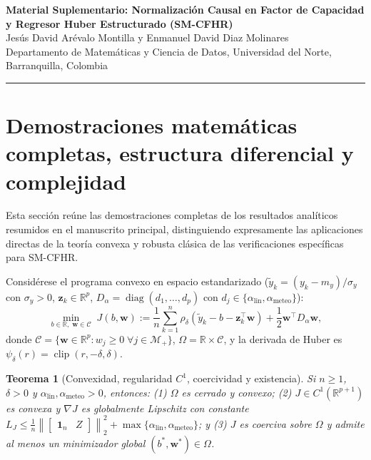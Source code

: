 \documentclass[11pt,a4paper]{article}
\newtheorem{theorem}{Teorema}
\DeclareMathOperator{\clip}{clip}
\DeclareMathOperator{\diag}{diag}
\begin{document}
\begin{center}
{\Large\bfseries Material Suplementario: Normalización Causal en Factor de Capacidad y Regresor Huber Estructurado (SM-CFHR)}\\[0.6em]
{\normalsize Jesús David Arévalo Montilla y Enmanuel David Diaz Molinares}\\
{\small Departamento de Matemáticas y Ciencia de Datos, Universidad del Norte, Barranquilla, Colombia}
\end{center}

\vspace{0.5em}
\hrule
\vspace{1em}

\section{Demostraciones matemáticas completas, estructura diferencial y complejidad}\label{sup:demos}

Esta sección reúne las demostraciones completas de los resultados analíticos resumidos en el manuscrito principal, distinguiendo expresamente las aplicaciones directas de la teoría convexa y robusta clásica \cite{boyd2004convex,huber1964,hampel1986robust,huber2009robust} de las verificaciones específicas para SM-CFHR.

Considérese el programa convexo en espacio estandarizado ($\tilde{y}_k = (y_k - m_y)/\sigma_y$ con $\sigma_y > 0$, $\mathbf{z}_k \in \mathbb{R}^p$, $D_\alpha = \diag(d_1,\dots,d_p)$ con $d_j \in \{\alpha_{\mathrm{lin}}, \alpha_{\mathrm{meteo}}\}$):
\begin{equation}
\min_{b \in \mathbb{R},\; \mathbf{w} \in \mathcal{C}} \; J(b, \mathbf{w}) := \frac{1}{n}\sum_{k=1}^{n} \rho_\delta\!\left(\tilde{y}_k - b - \mathbf{z}_k^\top \mathbf{w}\right) + \frac{1}{2}\mathbf{w}^\top D_\alpha \mathbf{w},
\label{eq:sup_obj}
\end{equation}
donde $\mathcal{C} = \{\mathbf{w} \in \mathbb{R}^p : w_j \ge 0 \;\forall j \in \mathcal{M}_+\}$, $\Omega = \mathbb{R} \times \mathcal{C}$, y la derivada de Huber es $\psi_\delta(r) = \clip(r, -\delta, \delta)$.

\begin{theorem}[Convexidad, regularidad $C^1$, coercividad y existencia]\label{sup:thm_conv}
Si $n \ge 1$, $\delta > 0$ y $\alpha_{\mathrm{lin}}, \alpha_{\mathrm{meteo}} > 0$, entonces: (1) $\Omega$ es cerrado y convexo; (2) $J \in C^1(\mathbb{R}^{p+1})$ es convexa y $\nabla J$ es globalmente Lipschitz con constante $L_J \le \frac{1}{n}\left\|\begin{bmatrix}\mathbf{1}_n & Z\end{bmatrix}\right\|_2^2 + \max\{\alpha_{\mathrm{lin}}, \alpha_{\mathrm{meteo}}\}$; y (3) $J$ es coerciva sobre $\Omega$ y admite al menos un minimizador global $(b^*, \mathbf{w}^*) \in \Omega$.
\end{theorem}
\end{document}
